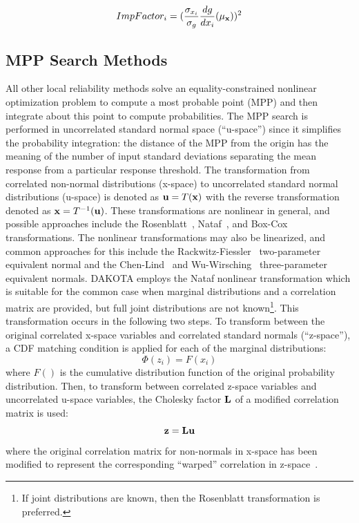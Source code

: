 \begin{equation}
ImpFactor_i  = ({\frac{\sigma_{x_{i}}}{\sigma_g}}{\frac{dg}{dx_i}(\mu_{\bf x})})^2
\end{equation}


\subsection{MPP Search Methods}\label{uq:reliability:mpp}

All other local reliability methods solve an equality-constrained nonlinear
optimization problem to compute a most probable point (MPP) and then
integrate about this point to compute probabilities.  The MPP search
is performed in uncorrelated standard normal space (``u-space'') since
it simplifies the probability integration: the distance of the MPP
from the origin has the meaning of the number of input standard
deviations separating the mean response from a particular response
threshold.  The transformation from correlated non-normal
distributions (x-space) to uncorrelated standard normal distributions
(u-space) is denoted as ${\bf u} = T({\bf x})$ with the reverse
transformation denoted as ${\bf x} = T^{-1}({\bf u})$.  These
transformations are nonlinear in general, and possible approaches
include the Rosenblatt~\cite{Ros52}, Nataf~\cite{Der86}, and
Box-Cox~\cite{Box64} transformations.  The nonlinear transformations
may also be linearized, and common approaches for this include the
Rackwitz-Fiessler~\cite{Rac78} two-parameter equivalent normal and the
Chen-Lind~\cite{Che83} and Wu-Wirsching~\cite{Wu87} three-parameter
equivalent normals.  DAKOTA employs the Nataf nonlinear transformation
which is suitable for the common case when marginal distributions and
a correlation matrix are provided, but full joint distributions are
not known\footnote{If joint distributions are known, then the
Rosenblatt transformation is preferred.}.  This transformation occurs 
in the following two steps.  To transform between the
original correlated x-space variables and correlated standard normals
(``z-space''), a CDF matching condition is applied for each of the
marginal distributions:
\begin{equation}
\Phi(z_i) = F(x_i) \label{eq:trans_zx}
\end{equation}
where $F()$ is the cumulative distribution function of the original
probability distribution.  Then, to transform between correlated
z-space variables and uncorrelated u-space variables, the Cholesky 
factor ${\bf L}$ of a modified correlation matrix is used:
\begin{equation}
{\bf z} = {\bf L} {\bf u} \label{eq:trans_zu}
\end{equation}
where the original correlation matrix for non-normals in x-space has
been modified to represent the corresponding ``warped'' correlation in 
z-space~\cite{Der86}.

